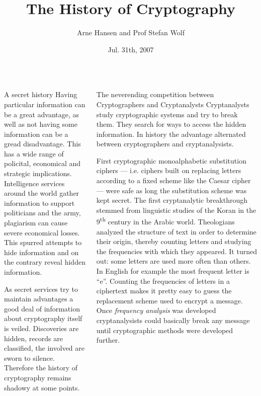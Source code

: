 \documentclass[final,hyperref={pdfpagelabels=false}]{beamer}
\title[Crypto History]{The History of Cryptography}
\author[Hansen and Wolf]{Arne Hansen and Prof Stefan Wolf}
\institute[USI]{Cryptography and Quantum Information, USI Lugano}
\date{Jul. 31th, 2007}
\begin{document}
  \begin{frame}{} 
    \vfill
    \begin{columns}[t]
    \begin{column}{.48\linewidth}
    \begin{block}{A secret history}
      Having particular information can be a great advantage, as well as not having some information can be a gread disadvantage. This has a wide range of policital, economical and strategic implications. Intelligence services around the world gather information to support politicians and the army, plagiarism can cause severe economical losses. This spurred attempts to hide information and on the contrary reveal hidden information. \par
      As secret services try to maintain advantages a good deal of information about cryptography itself is veiled. Discoveries are hidden, records are classified, the involved are sworn to silence. Therefore the history of cryptography remains shadowy at some points.
    \end{block}
    \end{column}
    \begin{column}{.48\linewidth}
      \begin{block}{The neverending competition between Cryptographers and Cryptanalysts}
        Cryptanalysts study cryptographic systems and try to break them. They search for ways to access the hidden information. In history the advantage alternated between cryptographers and cryptanalysists. 
        \par First cryptographic monoalphabetic substitution ciphers --- i.e. ciphers built on replacing letters according to a fixed scheme like the Caesar cipher --- were safe as long the substitution scheme was kept secret. The first cryptanalytic breakthrough stemmed from linguistic studies of the Koran in the 9\textsuperscript{th} century in the Arabic world. Theologians analyzed the structure of text in order to determine their origin, thereby counting letters and studying the frequencies with which they appeared. It turned out: some letters are used more often than others. In English for example the most frequent letter is ``e''. Counting the frequencies of letters in a ciphertext makes it pretty easy to guess the replacement scheme used to encrypt a message. Once {\em frequency analysis} was developed cryptanalysists could basically break any message until cryptographic methods were developed further.

\end{block}
\end{column}
\end{columns}
\end{frame}
\end{document}
